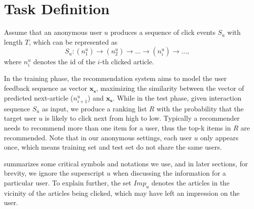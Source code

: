 \section{Task Definition}
\label{sec:task}
Assume that an anonymous user $u$ produces a sequence of click
events $S_u$ with length $T$, which can be represented as \[S_u: (n_1^u)\rightarrow(n_2^u)\rightarrow...\rightarrow(n_i^u)\rightarrow...,\]
where $n_i^u$ denotes the id of the $i$-th clicked article. 

In the training phase, the recommendation system aims to model the 
user feedback sequence as vector $\mathbf{x_s}$, 
maximizing the similarity between
the vector of predicted next-article ($n_{i+1}^u$) and $\mathbf{x_s}$. 
While in the test phase, 
given interaction sequence $S_u$ as input, 
we produce a ranking list $R$ with the probability that the target user $u$ is likely to click next from high to low. 
Typically a recommender needs to recommend more
than one item for a user, thus the top-k items in $R$ are recommended.
Note that in our anonymous settings, each user $u$ only appears once, 
which means training set and test set do not share the same users. 

 summarizes some critical symbols and notations we use, 
and in later sections, for brevity, we ignore the superscript $u$ 
when discussing the information for a particular user. To explain further, the set $Imp_u$ denotes the articles in the vicinity of the articles
being clicked, which may have left an impression on the user.


